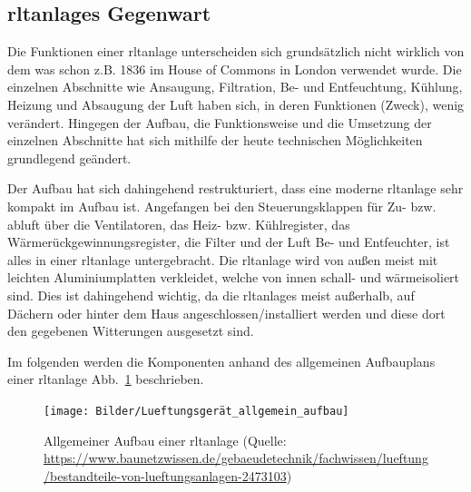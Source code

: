 \subsection{\Acp{rltanlage} Gegenwart}
Die Funktionen einer \ac{rltanlage} unterscheiden sich grundsätzlich nicht wirklich von dem was schon z.B. 1836 im House of Commons in London verwendet wurde. Die einzelnen Abschnitte wie \zB Ansaugung, Filtration, Be- und Entfeuchtung, Kühlung, Heizung und Absaugung der Luft haben sich, in deren Funktionen (Zweck), wenig verändert. Hingegen der Aufbau, die Funktionsweise und die Umsetzung der einzelnen Abschnitte hat sich mithilfe der heute technischen Möglichkeiten grundlegend geändert.

Der Aufbau hat sich dahingehend restrukturiert, dass eine moderne \ac{rltanlage} sehr kompakt im Aufbau ist. Angefangen bei den Steuerungsklappen für Zu- bzw. \gls{abluft} über die Ventilatoren, das Heiz- bzw. Kühlregister, das Wärmerückgewinnungsregister, die Filter und der Luft Be- und Entfeuchter, ist alles in einer \ac{rltanlage} untergebracht.
Die \ac{rltanlage} wird von außen meist mit leichten Aluminiumplatten verkleidet, welche von innen schall- und wärmeisoliert sind. Dies ist dahingehend wichtig, da die \acp{rltanlage} meist außerhalb, \zB auf Dächern oder hinter dem Haus angeschlossen/installiert werden und diese dort den gegebenen Witterungen ausgesetzt sind. 

Im folgenden werden die Komponenten anhand des allgemeinen Aufbauplans einer \ac{rltanlage} Abb.~\ref{fig:Aufbau_Lueftungsgerät_allgemein} beschrieben. 

\begin{figure}[H]
	\centering
	\texttt{[image: Bilder/Lueftungsgerät\_allgemein\_aufbau]}
	\caption{Allgemeiner Aufbau einer \ac{rltanlage} (Quelle: \url{https://www.baunetzwissen.de/gebaeudetechnik/fachwissen/lueftung/bestandteile-von-lueftungsanlagen-2473103})}
	\label{fig:Aufbau_Lueftungsgerät_allgemein}
\end{figure}

